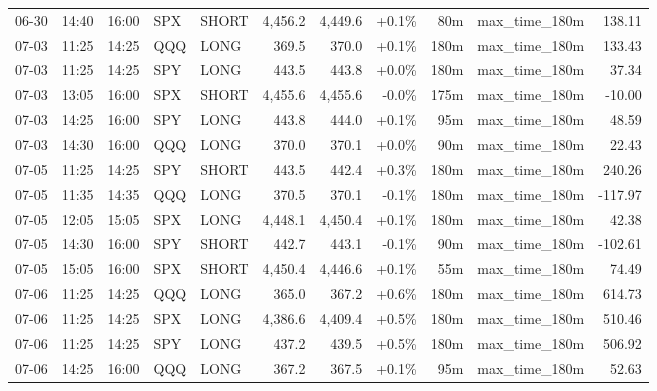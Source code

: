 \documentclass[11pt,a4paper,twoside]{article}
\begin{document}
\begin{center}
\begin{longtable}{>{\color{txtmain}}l l l l l r r r r >{\color{txtmain}}l r}
06-30 & 14:40 & 16:00 & SPX & SHORT & 4,456.2 & 4,449.6 & \textcolor{wingreen}{+0.1\%} & 80m & max\_time\_180m & \textcolor{wingreen}{138.11} \\
07-03 & 11:25 & 14:25 & QQQ & LONG & 369.5 & 370.0 & \textcolor{wingreen}{+0.1\%} & 180m & max\_time\_180m & \textcolor{wingreen}{133.43} \\
07-03 & 11:25 & 14:25 & SPY & LONG & 443.5 & 443.8 & \textcolor{wingreen}{+0.0\%} & 180m & max\_time\_180m & \textcolor{wingreen}{37.34} \\
07-03 & 13:05 & 16:00 & SPX & SHORT & 4,455.6 & 4,455.6 & \textcolor{wingreen}{-0.0\%} & 175m & max\_time\_180m & \textcolor{lossred}{-10.00} \\
07-03 & 14:25 & 16:00 & SPY & LONG & 443.8 & 444.0 & \textcolor{wingreen}{+0.1\%} & 95m & max\_time\_180m & \textcolor{wingreen}{48.59} \\
07-03 & 14:30 & 16:00 & QQQ & LONG & 370.0 & 370.1 & \textcolor{wingreen}{+0.0\%} & 90m & max\_time\_180m & \textcolor{wingreen}{22.43} \\
07-05 & 11:25 & 14:25 & SPY & SHORT & 443.5 & 442.4 & \textcolor{wingreen}{+0.3\%} & 180m & max\_time\_180m & \textcolor{wingreen}{240.26} \\
07-05 & 11:35 & 14:35 & QQQ & LONG & 370.5 & 370.1 & \textcolor{lossred}{-0.1\%} & 180m & max\_time\_180m & \textcolor{lossred}{-117.97} \\
07-05 & 12:05 & 15:05 & SPX & LONG & 4,448.1 & 4,450.4 & \textcolor{wingreen}{+0.1\%} & 180m & max\_time\_180m & \textcolor{wingreen}{42.38} \\
07-05 & 14:30 & 16:00 & SPY & SHORT & 442.7 & 443.1 & \textcolor{lossred}{-0.1\%} & 90m & max\_time\_180m & \textcolor{lossred}{-102.61} \\
07-05 & 15:05 & 16:00 & SPX & SHORT & 4,450.4 & 4,446.6 & \textcolor{wingreen}{+0.1\%} & 55m & max\_time\_180m & \textcolor{wingreen}{74.49} \\
07-06 & 11:25 & 14:25 & QQQ & LONG & 365.0 & 367.2 & \textcolor{wingreen}{+0.6\%} & 180m & max\_time\_180m & \textcolor{wingreen}{614.73} \\
07-06 & 11:25 & 14:25 & SPX & LONG & 4,386.6 & 4,409.4 & \textcolor{wingreen}{+0.5\%} & 180m & max\_time\_180m & \textcolor{wingreen}{510.46} \\
07-06 & 11:25 & 14:25 & SPY & LONG & 437.2 & 439.5 & \textcolor{wingreen}{+0.5\%} & 180m & max\_time\_180m & \textcolor{wingreen}{506.92} \\
07-06 & 14:25 & 16:00 & QQQ & LONG & 367.2 & 367.5 & \textcolor{wingreen}{+0.1\%} & 95m & max\_time\_180m & \textcolor{wingreen}{52.63} \\

\end{longtable}
\end{center}
\end{document}
